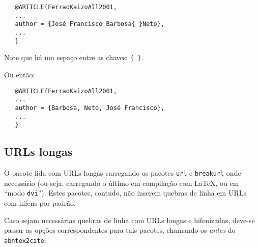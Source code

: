 \documentclass[a4paper]{ltxdoc}
\begin{document}
\begin{verbatim}
   @ARTICLE{FerraoKaizoAll2001,
   ...
   author = {José Francisco Barbosa{ }Neto},
   ...
   }
\end{verbatim}

Note que há um espaço entre as chaves: \verb+{ }+.
   
Ou então:

\begin{verbatim}
   @ARTICLE{FerraoKaizoAll2001,
   ...
   author = {Barbosa, Neto, José Francisco},
   ...
   }

\end{verbatim}

\subsection{URLs longas}

O pacote lida com URLs longas carregando os pacotes \texttt{url} e
\texttt{breakurl} onde necessário (ou seja, carregando o último em
compilação com \LaTeX, ou em ``modo \texttt{dvi}''). Estes pacotes,
contudo, não inserem quebras de linha em URLs com hífens por padrão. 

Caso sejam necessárias quebras de linha com URLs longas e hifenizadas,
deve-se passar as opções correspondentes para tais pacotes, chamando-os
\emph{antes} do \texttt{abntex2cite}:
\end{document}
